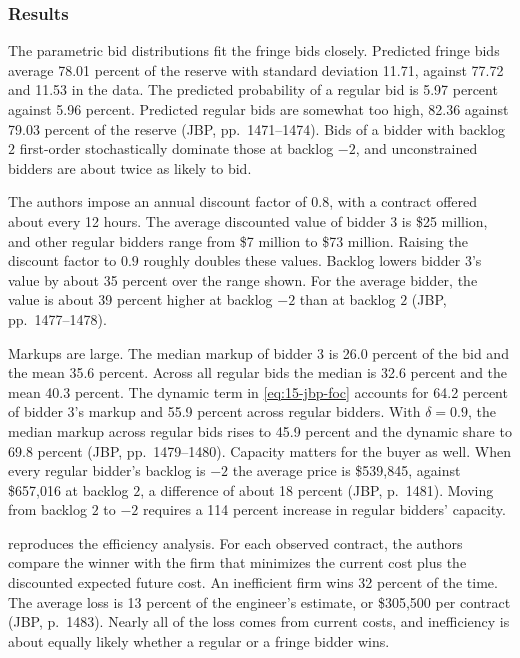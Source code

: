 \subsubsection{Results}

The parametric bid distributions fit the fringe bids closely. Predicted fringe bids average 78.01
percent of the reserve with standard deviation 11.71, against 77.72 and 11.53 in the data. The predicted
probability of a regular bid is 5.97 percent against 5.96 percent. Predicted regular bids are somewhat
too high, 82.36 against 79.03 percent of the reserve (JBP, pp.~1471--1474). Bids of a bidder with backlog
$2$ first-order stochastically dominate those at backlog $-2$, and unconstrained bidders are about twice
as likely to bid.

The authors impose an annual discount factor of $0.8$, with a contract offered about every 12 hours.
The average discounted value of bidder 3 is \$25 million, and other regular bidders range from \$7
million to \$73 million. Raising the discount factor to $0.9$ roughly doubles these values. Backlog lowers
bidder 3's value by about 35 percent over the range shown. For the average bidder, the value is about 39
percent higher at backlog $-2$ than at backlog $2$ (JBP, pp.~1477--1478).

Markups are large. The median markup of bidder 3 is 26.0 percent of the bid and the mean 35.6
percent. Across all regular bids the median is 32.6 percent and the mean 40.3 percent. The dynamic term
in \eqref{eq:15-jbp-foc} accounts for 64.2 percent of bidder 3's markup and 55.9 percent across regular
bidders. With $\delta=0.9$, the median markup across regular bids rises to 45.9 percent and the dynamic
share to 69.8 percent (JBP, pp.~1479--1480). Capacity matters for the buyer as well. When every regular
bidder's backlog is $-2$ the average price is \$539,845, against \$657,016 at backlog $2$, a difference of
about 18 percent (JBP, p.~1481). Moving from backlog $2$ to $-2$ requires a 114 percent increase in
regular bidders' capacity.

 reproduces the efficiency analysis. For each observed contract, the authors
compare the winner with the firm that minimizes the current cost plus the discounted expected future
cost. An inefficient firm wins 32 percent of the time. The average loss is 13 percent of the engineer's
estimate, or \$305,500 per contract (JBP, p.~1483). Nearly all of the loss comes from current costs,
and inefficiency is about equally likely whether a regular or a fringe bidder wins.

